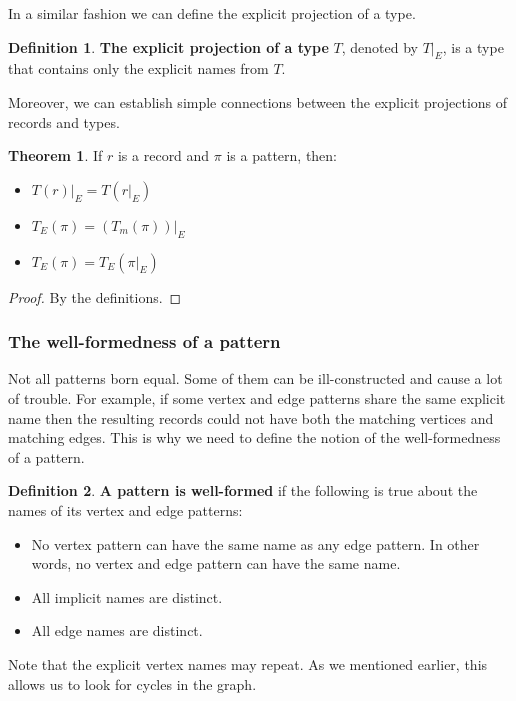 \documentclass[14pt]{constructor-thesis}
\theoremstyle{definition}
\newtheorem{theorem}{Theorem}
\newtheorem{definition}{Definition}
\begin{document}
In a similar fashion we can define the explicit projection of a type.
\begin{definition}
  \textbf{The explicit projection of a type} $T$, denoted by $T |_E$, is a type that contains only the explicit names from $T$.
\end{definition}

Moreover, we can establish simple connections between the explicit projections of records and types.
\begin{theorem}
  \label{thm:explicit-projections-and-types}
  If $r$ is a record and $\pi$ is a pattern, then:
  \begin{itemize}
    \item $T(r)|_E = T(r|_E)$
    \item $T_E(\pi) = (T_m(\pi)) |_E$
    \item $T_E(\pi) = T_E(\pi |_E)$
  \end{itemize}
\end{theorem}
\begin{proof}
  By the definitions.
\end{proof}

\subsubsection{The well-formedness of a pattern}

Not all patterns born equal. Some of them can be ill-constructed and cause a lot of trouble. For example, if some vertex and edge patterns share the same explicit name then the resulting records could not have both the matching vertices and matching edges. This is why we need to define the notion of the well-formedness of a pattern.

\begin{definition}
  \textbf{A pattern is well-formed} if the following is true about the names of its vertex and edge patterns:
  \begin{itemize}
    \item No vertex pattern can have the same name as any edge pattern. In other words, no vertex and edge pattern can have the same name.
    \item All implicit names are distinct.
    \item All edge names are distinct.
  \end{itemize}
\end{definition}

Note that the explicit vertex names may repeat. As we mentioned earlier, this allows us to look for cycles in the graph.
\end{document}
